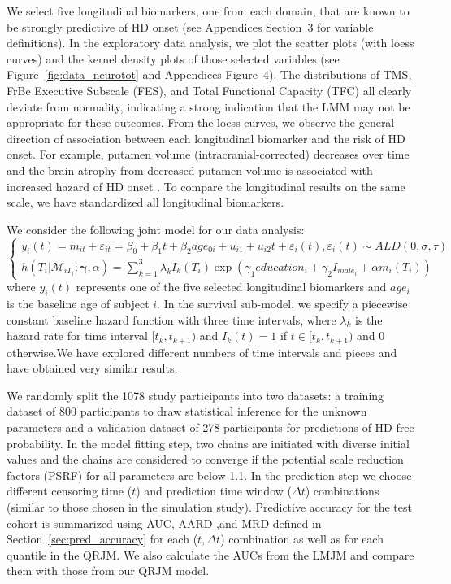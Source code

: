 We select five longitudinal biomarkers, one from each domain, that are known to be strongly predictive of HD onset \citep{paulsen2014prediction} (see Appendices Section~3 for variable definitions). In the exploratory data analysis, we plot the scatter plots (with loess curves) and the kernel density plots of those selected variables (see Figure~\ref{fig:data_neurotot} and Appendices Figure~4). The distributions of TMS, {FrBe Executive Subscale} (FES), and {Total Functional Capacity} (TFC) all clearly deviate from normality, indicating a strong indication that the LMM may not be appropriate for these outcomes. From the loess curves, we observe the general direction of association between each longitudinal biomarker and the risk of HD onset. For example, {putamen} volume (intracranial-corrected) decreases over time and the brain atrophy from decreased putamen volume is associated with increased hazard of HD onset \cite{paulsen2014prediction}. To compare the longitudinal results on the same scale, we have standardized all longitudinal biomarkers.



We consider the following joint model for our data analysis:
\begin{equation*}\label{eqn:data_joint}
\left\{
\begin{array}{l}
y_{i}(t) = m_{it} + \varepsilon_{it} = \beta_0 + \beta_1 t+ \beta_2 age_{0i} + {u}_{i1} + u_{i2} t + \varepsilon_{i}(t),  \varepsilon_{i}(t)\sim ALD(0, \sigma, \tau)\\
h(T_i|\mathcal{M}_{iT_i};  \boldsymbol{\gamma}, \alpha) = \sum_{k=1}^3\lambda_kI_k(T_i)\exp(\gamma_1 education_i + \gamma_2 I_{male_i} + \alpha m_i(T_i))
\end{array}
\right.
\end{equation*}
where $y_{i}(t)$ represents one of the five selected longitudinal biomarkers and $age_i$ is the baseline age of subject $i$. In the survival sub-model, we specify a piecewise constant baseline hazard function with three time intervals, where $\lambda_k$ is the hazard rate for time interval $[t_k, t_{k+1})$ and $I_k(t)=1$ if $t\in[t_k, t_{k+1})$ and 0 otherwise.We have explored different numbers of time intervals and pieces and have obtained very similar results.

We randomly split the 1078 study participants into two datasets: a training dataset of 800 participants to draw statistical inference for the unknown parameters and a validation dataset of 278 participants for predictions of HD-free probability. In the model fitting step, two chains are initiated with diverse initial values and the chains are considered to converge if the potential scale reduction factors (PSRF) \citep{brooks1998general} for all parameters are below 1.1. In the prediction step we choose different censoring time ($t$) and prediction time window ($\Delta t$) combinations (similar to those chosen in the simulation study). Predictive accuracy for the test cohort is summarized using AUC, AARD ,and MRD defined in Section~\ref{sec:pred_accuracy} for each ($t, \Delta t$) combination as well as for each quantile in the QRJM. We also calculate the AUCs from the LMJM and compare them with those from our QRJM model.



